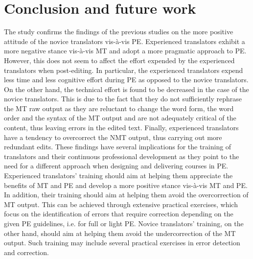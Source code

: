 \documentclass[output=paper]{langscibook}
\begin{document}
\section{Conclusion and future work}
The study confirms the findings of the previous studies on the more positive attitude of the novice translators vis-à-vis PE. Experienced translators exhibit a more negative stance vis-à-vis MT and adopt a more pragmatic approach to PE. However, this does not seem to affect the effort expended by the experienced translators when post-editing. In particular, the experienced translators expend less time and less cognitive effort during PE as opposed to the novice translators. On the other hand, the technical effort is found to be decreased in the case of the novice translators. This is due to the fact that they do not sufficiently rephrase the MT raw output as they are reluctant to change the word form, the word order and the syntax of the MT output and are not adequately critical of the content, thus leaving errors in the edited text. Finally, experienced translators have a tendency to overcorrect the NMT output, thus carrying out more redundant edits. These findings have several implications for the training of translators and their continuous professional development as they point to the need for a different approach when designing and delivering courses in PE. Experienced translators’ training should aim at helping them appreciate the benefits of MT and PE and develop a more positive stance vis-à-vis MT and PE. In addition, their training should aim at helping them avoid the overcorrection of MT output. This can be achieved through extensive practical exercises, which focus on the identification of errors that require correction depending on the given PE guidelines, i.e. for full or light PE. Novice translators’ training, on the other hand, should aim at helping them avoid the undercorrection of the MT output. Such training may include several practical exercises in error detection and correction.
\end{document}
